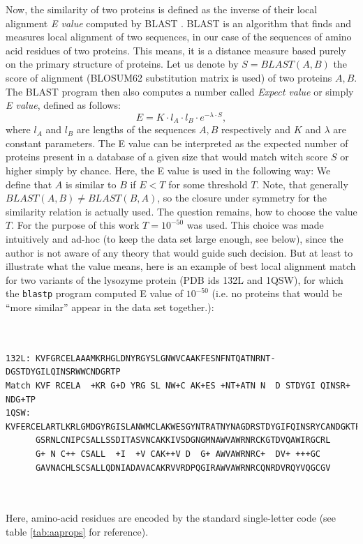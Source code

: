 \documentclass[11pt,twoside,a4paper]{book}
\begin{document}
Now, the similarity of two proteins is defined as the inverse of their local alignment \emph{E value} computed by BLAST \cite{blast} \cite{blastp}.
BLAST is an algorithm that finds and measures local alignment of two sequences,
in our case of the sequences of amino acid residues of two proteins. 
This means, it is a distance measure based purely on the primary structure of proteins.
Let us denote by $S = BLAST(A,B)$ the score of alignment (BLOSUM62 substitution matrix is used) 
of two proteins $A, B$.
The BLAST program then also computes a number called \emph{Expect value} or simply \emph{E value}, 
defined as follows:
\[ E = K \cdot l_A \cdot l_B \cdot e^{-\lambda \cdot S}, \]
where $l_A$ and $l_B$ are lengths of the sequences $A,B$ respectively and $K$ and $\lambda$ are constant parameters.
The E value can be interpreted as the expected number of proteins present in a database of a given size
that would match witch score $S$ or higher simply by chance.
Here, the E value is used in the following way: We define that $A$ is similar to $B$ if $E < T$ for some threshold $T$.
Note, that generally $BLAST(A,B) \neq BLAST(B,A)$,
so the closure under symmetry for the similarity relation is actually used.
The question remains, how to choose the value $T$.
For the purpose of this work $T = 10^{-50}$ was used.
This choice was made intuitively and ad-hoc (to keep the data set large enough, see below),
since the author is not aware of any theory that would guide such decision.
But at least to illustrate what the value means, here is an example of best local alignment match
for two variants of the lysozyme protein (PDB ids 132L and 1QSW), for which the \texttt{blastp} program computed E value of $10^{-50}$
(i.e. no proteins that would be ``more similar'' appear in the data set together.):
\begin{minipage}{\linewidth}
\begin{verbatim}


132L: KVFGRCELAAAMKRHGLDNYRGYSLGNWVCAAKFESNFNTQATNRNT-DGSTDYGILQINSRWWCNDGRTP
Match KVF RCELA  +KR G+D YRG SL NW+C AK+ES +NT+ATN N  D STDYGI QINSR+  NDG+TP
1QSW: KVFERCELARTLKRLGMDGYRGISLANWMCLAKWESGYNTRATNYNAGDRSTDYGIFQINSRYCANDGKTP
      GSRNLCNIPCSALLSSDITASVNCAKKIVSDGNGMNAWVAWRNRCKGTDVQAWIRGCRL
      G+ N C++ CSALL  +I  +V CAK++V D  G+ AWVAWRNRC+  DV+ +++GC
      GAVNACHLSCSALLQDNIADAVACAKRVVRDPQGIRAWVAWRNRCQNRDVRQYVQGCGV
      
      
\end{verbatim}
\end{minipage}
Here, amino-acid residues are encoded by the standard single-letter code (see table \ref{tab:aaprops} for reference). 
\end{document}
